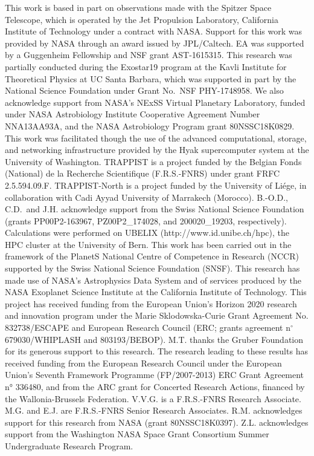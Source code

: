 \documentclass[twocolumn]{aastex63}
\begin{document}
This work is based in part on observations made with the Spitzer Space Telescope, which
is operated by the Jet Propulsion Laboratory, California Institute of Technology under
a contract with NASA. Support for this work was provided by NASA through an award issued
by JPL/Caltech.  EA was supported by a Guggenheim Fellowship and NSF grant AST-1615315.
This research was partially conducted during the Exostar19 program at the Kavli Institute 
for Theoretical Physics at UC Santa Barbara, which was supported in part by the National
Science Foundation under Grant No.\ NSF PHY-1748958.
We also acknowledge support from NASA's NExSS Virtual Planetary Laboratory, funded under
NASA Astrobiology Institute Cooperative Agreement Number NNA13AA93A, and the NASA Astrobiology
Program grant 80NSSC18K0829.
This work was facilitated though the use of the advanced computational, storage, and
networking infrastructure provided by the Hyak supercomputer system at the University of
Washington. TRAPPIST is a project funded by the Belgian Fonds (National) de la Recherche 
Scientifique (F.R.S.-FNRS) under grant FRFC 2.5.594.09.F. TRAPPIST-North is a project funded 
by the University of Li\'ege, in collaboration with Cadi Ayyad University of Marrakech (Morocco).
B.-O.D., C.D.\ and J.H. acknowledge support from the Swiss National Science Foundation (grants
PP00P2-163967, PZ00P2\_174028, and 200020\_19203, respectively).
Calculations were performed on UBELIX (http://www.id.unibe.ch/hpc), the HPC
cluster at the University of Bern. This work has been carried out in the framework of the PlanetS National Centre
of Competence in Research (NCCR) supported by the Swiss National Science Foundation (SNSF).
This research has made use of NASA's Astrophysics Data System and of services produced by
the NASA Exoplanet Science Institute at the California Institute of Technology.
This project has received funding from the European Union's Horizon 2020 research and
innovation program under the Marie Sklodowska-Curie Grant Agreement No. 832738/ESCAPE and European Research Council (ERC; grants agreement n$^\circ$ 679030/WHIPLASH and 803193/BEBOP). M.T.
thanks the Gruber Foundation for its generous support to this research.
The research leading to these results has received funding from the European Research Council
under the European Union's Seventh Framework Programme (FP/2007-2013) ERC Grant
Agreement n° 336480, and from the ARC grant for Concerted Research Actions, financed by the
Wallonia-Brussels Federation. V.V.G. is a F.R.S.-FNRS Research Associate. M.G. and E.J. are F.R.S.-FNRS Senior Research Associates. R.M. acknowledges support for this research from NASA (grant 80NSSC18K0397). Z.L. acknowledges support from the Washington NASA Space Grant Consortium Summer Undergraduate Research Program.
\end{document}
